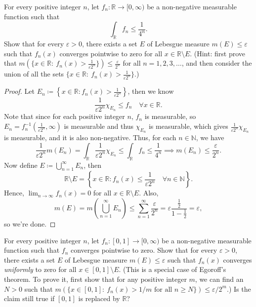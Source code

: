 \begin{problem}
    For every positive integer $n$, let $f_n:\mathbb{R}\to[0,\infty)$ be a non-negative measurable function such that
$$
\int_{\mathbb{R}} f_n \le \frac{1}{4^n}.
$$
Show that for every $\varepsilon>0$, there exists a set $E$ of Lebesgue measure $m(E)\le \varepsilon$ such that $f_n(x)$ converges pointwise to zero for all $x\in\mathbb{R}\setminus E$.
(Hint: first prove that $m(\{x\in\mathbb{R}:\ f_n(x)>\frac{1}{\varepsilon 2^n}\})\le \frac{\varepsilon}{2^n}$ for all $n=1,2,3,\dots$, and then consider the union of all the sets $\{x\in\mathbb{R}:\ f_n(x)>\frac{1}{\varepsilon 2^n}\}$.)
\end{problem}

\begin{proof}
    Let \(E_n \coloneqq \left\{ x \in \mathbb{R} : f_n(x) > \frac{1}{\varepsilon 2^n} \right\} \), then we know 
    \[
        \frac{1}{\varepsilon 2^n} \chi _{E_n} \le f_n \quad \forall x \in \mathbb{R}.
    \] 
    Note that since for each positive integer \(n\), \(f_n\) is measurable, so \(E_n = f_n^{-1} \left( \frac{1}{\varepsilon 2^n}, \infty \right) \) is measurable and thus \(\chi _{E_n}\) is measurable, which gives \(\frac{1}{\varepsilon 2^n} \chi _{E_n}\) is measurable, and it is also non-negative. Thus, for each \(n \in \mathbb{N}\), we have 
    \[
        \frac{1}{\varepsilon 2^n} m(E_n) = \int _{\mathbb{R} } \frac{1}{\varepsilon 2^n} \chi _{E_n} \le \int_{\mathbb{R} } f_n \le \frac{1}{4^n} \implies m(E_n) \le \frac{\varepsilon}{2^n}.
    \]  
    Now define \(E \coloneqq \bigcup_{n=1}^{\infty} E_n \), then 
    \[
        \mathbb{R} \setminus E = \left\{ x \in \mathbb{R}: f_{n}(x) \le \frac{1}{\varepsilon 2^n} \quad \forall n \in \mathbb{N} \right\}. 
    \] 
    Hence, \(\lim_{n \to \infty} f_n(x) = 0\) for all \(x \in \mathbb{R} \setminus E\). Also, 
    \[
        m(E) = m \left( \bigcup_{n=1}^{\infty} E_n  \right) \le \sum_{n=1}^{\infty} \frac{\varepsilon}{2^n} = \varepsilon \frac{\frac{1}{2}}{1 - \frac{1}{2}} = \varepsilon,  
    \]  
    so we're done.
\end{proof}

\begin{problem}
    For every positive integer $n$, let $f_n:[0,1]\to[0,\infty)$ be a non-negative measurable function such that $f_n$ converges pointwise to zero.
Show that for every $\varepsilon>0$, there exists a set $E$ of Lebesgue measure $m(E)\le \varepsilon$ such that $f_n(x)$ converges \emph{uniformly} to zero for all $x\in[0,1]\setminus E$.
(This is a special case of Egoroff's theorem.
To prove it, first show that for any positive integer $m$, we can find an $N>0$ such that
$m(\{x\in[0,1]:\ f_n(x)>1/m \text{ for all }n\ge N\})\le \varepsilon/2^m$.)
Is the claim still true if $[0,1]$ is replaced by $\mathbb{R}$?
\end{problem}

